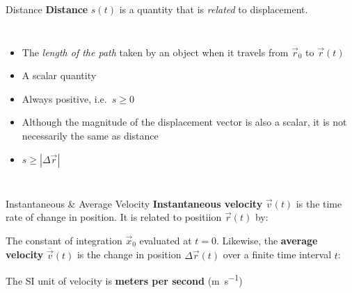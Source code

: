 \documentclass[12pt,compress,aspectratio=169,dvipsnames]{beamer}
\begin{document}
\begin{frame}{Distance}
  \textbf{Distance} $s(t)$ is a quantity that is \emph{related} to displacement.
  \begin{columns}
    \begin{itemize}
    \item The \emph{length of the path} taken by an object when it travels from
      $\vec r_0$ to $\vec r(t)$
    \item A scalar quantity
    \item Always positive, i.e.\ $s\geq 0$
    \item Although the magnitude of the displacement vector is also a scalar,
      it is not necessarily the same as distance
    \item $s\geq |\Delta\vec r|$
    \end{itemize}
    
  \end{columns}
\end{frame}



\begin{frame}{Instantaneous \& Average Velocity}
  \textbf{Instantaneous velocity} $\vec v(t)$ is the time rate of change in
  position. It is related to positiion $\vec r(t)$ by:


  The constant of integration $\vec x_0$ evaluated at $t=0$. Likewise, the
  \textbf{average velocity} $\overline{\vec v}(t)$ is the change in
  position $\Delta\vec r(t)$ over a finite time interval $t$:


  The SI unit of velocity is \textbf{meters per second} (\si{\metre\per\second})
\end{frame}
\end{document}
